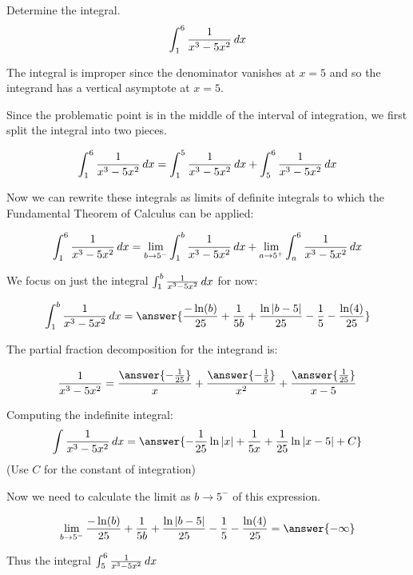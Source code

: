 \documentclass{ximera}
\author{Jason Miller}
\begin{document}
\begin{exercise}
Determine the integral.
\[
\int_{1}^{6} \frac{1}{x^{3}-5x^{2}} \mathop{}\!d x
\]

The integral is improper since the denominator vanishes at $x=5$ and so the integrand has a vertical asymptote at $x=5$. 

Since the problematic point is in the middle of the interval of integration, we first split the integral into two pieces. 

\[
\int _{1}^{6} \frac{1}{x^{3}-5x^{2}} \mathop{}\!d x=\int_{1}^{5} \frac{1}{x^{3}-5x^{2}} \mathop{}\!d x + \int_{5}^{6} \frac{1}{x^{3}-5x^{2}} \mathop{}\!d x
\]

Now we can rewrite these integrals as limits of definite integrals to which the Fundamental Theorem of Calculus can be applied: 

\[
\int_{1}^{6} \frac{1}{x^{3}-5x^{2}} \mathop{}\!d x= \lim_{b \to 5^{-}} \int_{1}^{b} \frac{1}{x^{3}-5x^{2}} \mathop{}\!d x + \lim_{a \to 5^{+}} \int _{a}^{6} 
\frac{1}{x^{3}-5x^{2}} \mathop{}\!d x
\]


We focus on just the integral $\int_{1}^{b} \frac{1}{x^{3}-5x^{2}} \mathop{}\!d x$ for now:

\[
\int_{1}^{b} \frac{1}{x^{3}-5x^{2}} \d x=\answer{  \frac{-\ln(b)}{25} +\frac{1}{5b} + \frac{\ln|b-5|}{25}-\frac{1}{5}-\frac{\ln(4)}{25}  }
\]

\begin{hint}
The partial fraction decomposition for the integrand is:

\[
\frac{1}{x^3-5x^2} = \frac{\answer{-\frac{1}{25}}}{x}+ \frac{\answer{-\frac{1}{5}}}{x^2}+\frac{\answer{\frac{1}{25}}}{x-5}
\]
\begin{question}
Computing the indefinite integral:
\[
\int \frac{1}{x^3-5x^2} \d x = \answer{-\frac{1}{25} \ln|x| + \frac{1}{5x} +\frac{1}{25} \ln|x-5|+C}
\]
(Use $C$ for the constant of integration)
\end{question}
\end{hint}

\begin{exercise}
Now we need to calculate the limit as $b \to 5^{-}$ of this expression. 

\[
\lim_{b \to 5^{-}}  \frac{-\ln(b)}{25} +\frac{1}{5b} + \frac{\ln|b-5|}{25}-\frac{1}{5}-\frac{\ln(4)}{25} =\answer{ -\infty}
\]

\begin{exercise}
Thus the integral $\int_{5}^{6} \frac{1}{x^{3}-5x^{2}} \mathop{}\!d x$

\begin{multipleChoice}
\end{multipleChoice}


\end{exercise}
\end{exercise}
\end{exercise}
\end{document}
